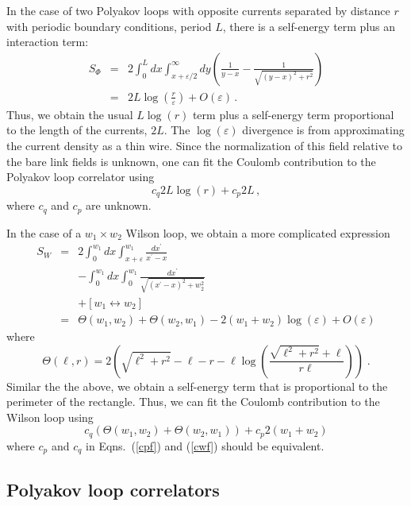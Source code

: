 \documentclass[preprint,aps,prd]{revtex4-2}
\newcommand{\be}{\begin{equation}}
\newcommand{\eq}{\end{equation}}
\begin{document}
In the case of two Polyakov loops with opposite currents separated
by distance $r$ with periodic boundary conditions, period $L$,
there is a self-energy term plus an interaction term:
%
\begin{eqnarray}
S_\Phi &=& 2 \int_0^L dx \int_{x+\varepsilon/2}^\infty dy
\left(\frac{1}{y-x} -\frac{1}{\sqrt{(y-x)^2 + r^2}}\right) \\
  &=& 2 L \log\left(\frac{r}{\varepsilon}\right) + O(\varepsilon)\, .
\end{eqnarray}
%
Thus, we obtain the usual $L \log(r)$ term plus a
self-energy term proportional to the length
of the currents, $2L$.  The $\log(\varepsilon)$ divergence
is from approximating the current density as a thin wire.
Since the normalization
of this field relative to the bare link fields is
unknown, one can fit the Coulomb contribution to the
Polyakov loop correlator using
\be
       c_q 2 L \log(r) + c_p 2 L \, , \label{cpf}
\eq
where $c_q$ and $c_p$ are unknown.

In the case of a $w_1\times w_2$ Wilson loop, we obtain
a more complicated expression
%
\begin{eqnarray}
  S_W &=& 2 \int_0^{w_1} dx \int_{x+\varepsilon}^{w_1} \frac{dx^\prime}{x^\prime-x}
               \nonumber\\
               & &  - \int_0^{w_1} dx \int_{0}^{w_1} \frac{dx^\prime}{
                 \sqrt{(x^\prime-x)^2+ w_2^2}}
               \nonumber\\
               & &  +\left[w_1 \leftrightarrow w_2 \right]\\
               &=&  \Theta\!\left(w_1, w_2\right) +
               \Theta\!\left(w_2, w_1\right)
              - 2 (w_1 + w_2) \log(\varepsilon) + O(\varepsilon) 
\end{eqnarray}
where
\be
\Theta\!\left(\ell, r\right) = 2 \left(
    \sqrt{\ell^2+r^2} - \ell - r
    - \ell\log\left(\frac{\sqrt{\ell^2+r^2} + \ell}{r\ell}\right)
   \right) \;.
\eq
Similar the the above, 
we obtain a self-energy term that is proportional to the perimeter of
the rectangle.  Thus, we can fit the Coulomb
contribution to the Wilson loop using
%
\be
    c_q  \left(\Theta\!\left(w_1, w_2\right) +
               \Theta\!\left(w_2, w_1\right)\right)
        + c_p  2\left(w_1+w_2\right)  \label{cwf}
\eq
%
where $c_p$ and $c_q$ in Eqns.~(\ref{cpf}) and (\ref{cwf})
should be equivalent.

\subsection{Polyakov loop correlators}
\end{document}
